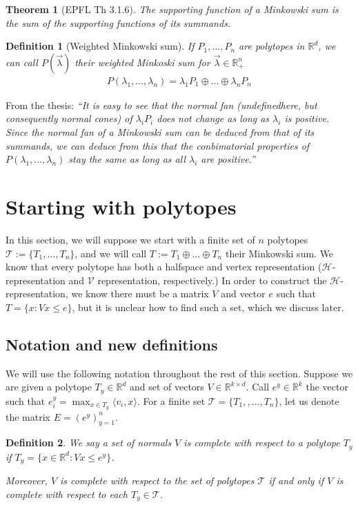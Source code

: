 \documentclass[12pt]{article}
\newcommand{\reals}{\mathbb{R}}
\renewcommand{\H}{\mathcal{H}}
\newcommand{\T}{\mathcal{T}}
\newcommand{\V}{\mathcal{V}}
\newcommand{\inprod}[2]{\langle #1, #2 \rangle}%
\newtheorem{theorem}{Theorem}
\newtheorem{definition}{Definition}
\begin{document}
\begin{theorem}[EPFL Th 3.1.6]\label{thm:support-minksum}
  The supporting function of a Minkowski sum is the sum of the supporting functions of its summands.
\end{theorem}

\begin{definition}[Weighted Minkowski sum]
  If $P_1, \ldots, P_n$ are polytopes in $\reals^d$, we can call $P(\vec \lambda)$ their \emph{weighted} Minkoski sum for $\vec \lambda \in \reals^n_+$
  \begin{align*}
    P(\lambda_1, \ldots, \lambda_n) = \lambda_1 P_1 \oplus \ldots \oplus \lambda_n P_n
  \end{align*}
\end{definition}

  From the thesis:  \emph{``It is easy to see that the normal fan (undefinedhere, but consequently normal cones) of $\lambda_i P_i$ does not change as long as $\lambda_i$ is positive.  Since the normal fan of a Minkowski sum can be deduced from that of its summands, we can deduce from this that the conbimatorial properties of $P(\lambda_1, \ldots, \lambda_n)$ stay the same as long as all $\lambda_i$ are positive.''}

  \section{Starting with polytopes}\label{sec:start-polytope}
  In this section, we will suppose we start with a finite set of $n$ polytopes $\T := \{T_1, \ldots, T_n\}$, and we will call $T := T_1 \oplus \ldots \oplus T_n$ their Minkowski sum.
  We know that every polytope has both a halfspace and vertex representation ($\H$-representation and $\V$ representation, respectively.)
  In order to construct the $\H$-representation, we know there must be a matrix $V$ and vector $e$ such that $T = \{x : Vx \leq e\}$, but it is unclear how to find such a set, which we discuss later.

  \subsection{Notation and new definitions}
  We will use the following notation throughout the rest of this section.
  Suppose we are given a polytope $T_y \in \reals^d$ and set of vectors $V \in \reals^{k \times d}$.
  Call $e^y \in \reals^k$ the vector such that $e^y_i = \max_{x \in T_y}\inprod{v_i}{x}$.  
  For a finite set $\T = \{T_1, , \ldots, T_n\}$, let us denote the matrix $E = (e^y)_{y=1}^n$.
  \begin{definition}
    We say a set of normals $V$ is \emph{complete} with respect to a polytope $T_y$ if $T_y = \{x \in \reals^d: Vx \leq e^y\}$.

    Moreover, $V$ is complete with respect to the set of polytopes $\T$ if and only if $V$ is complete with respect to each $T_y \in \T$.
  \end{definition}
\end{document}
